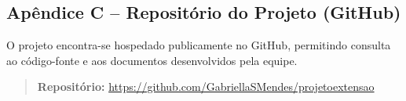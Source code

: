 \begin{apendicesenv}
\section{Apêndice C – Repositório do Projeto (GitHub)}

O projeto encontra-se hospedado publicamente no GitHub, permitindo consulta ao código-fonte e aos documentos desenvolvidos pela equipe.

\begin{quote}
\textbf{Repositório:} \url{https://github.com/GabriellaSMendes/projetoextensao}
\end{quote}

\end{apendicesenv}